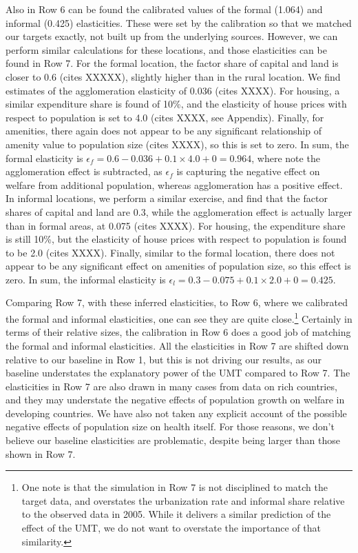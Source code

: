 \documentclass[10pt]{article}
\begin{document}
Also in Row 6 can be found the calibrated values of the formal (1.064) and informal (0.425) elasticities. These were set by the calibration so that we matched our targets exactly, not built up from the underlying sources. However, we can perform similar calculations for these locations, and those elasticities can be found in Row 7. For the formal location, the factor share of capital and land is closer to 0.6 (cites XXXXX), slightly higher than in the rural location. We find estimates of the agglomeration elasticity of 0.036 (cites XXXX). For housing, a similar expenditure share is found of 10\%, and the elasticity of house prices with respect to population is set to 4.0 (cites XXXX, see Appendix). Finally, for amenities, there again does not appear to be any significant relationship of amenity value to population size (cites XXXX), so this is set to zero. In sum, the formal elasticity is $\epsilon_f = 0.6 - 0.036 + 0.1\times 4.0 + 0 = 0.964$, where note the agglomeration effect is subtracted, as $\epsilon_f$ is capturing the negative effect on welfare from additional population, whereas agglomeration has a positive effect. In informal locations, we perform a similar exercise, and find that the factor shares of capital and land are 0.3, while the agglomeration effect is actually larger than in formal areas, at 0.075 (cites XXXX). For housing, the expenditure share is still 10\%, but the elasticity of house prices with respect to population is found to be 2.0 (cites XXXX). Finally, similar to the formal location, there does not appear to be any significant effect on amenities of population size, so this effect is zero. In sum, the informal elasticity is $\epsilon_l = 0.3 - 0.075 + 0.1 \times 2.0 + 0 = 0.425$.

Comparing Row 7, with these inferred elasticities, to Row 6, where we calibrated the formal and informal elasticities, one can see they are quite close.\footnote{One note is that the simulation in Row 7 is not disciplined to match the target data, and overstates the urbanization rate and informal share relative to the observed data in 2005. While it delivers a similar prediction of the effect of the UMT, we do not want to overstate the importance of that similarity.} Certainly in terms of their relative sizes, the calibration in Row 6 does a good job of matching the formal and informal elasticities. All the elasticities in Row 7 are shifted down relative to our baseline in Row 1, but this is not driving our results, as our baseline understates the explanatory power of the UMT compared to Row 7. The elasticities in Row 7 are also drawn in many cases from data on rich countries, and they may understate the negative effects of population growth on welfare in developing countries. We have also not taken any explicit account of the possible negative effects of population size on health itself. For those reasons, we don't believe our baseline elasticities are problematic, despite being larger than those shown in Row 7. 
\end{document}
